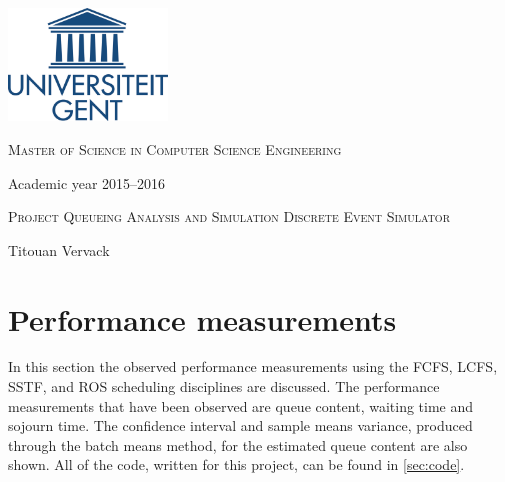 \documentclass[a4paper]{article}
\begin{document}
\begin{titlepage}
\fontsize{12pt}{14pt}\selectfont

\begin{center}

\includegraphics[height=3cm]{logo}

\vspace{1cm}

\fontsize{14pt}{17pt}\selectfont
\textsc{Master of Science in Computer Science Engineering}
\fontsize{12pt}{14pt}\selectfont
\vspace{0.3cm}

\vspace{1.2cm}

Academic year 2015--2016

\vspace{2.8cm}

\fontsize{17.28pt}{21pt}\selectfont

\textsc{Project Queueing Analysis and Simulation}
\fontsize{14.28pt}{21pt}\selectfont
\textsc{Discrete Event Simulator}

\fontsize{12pt}{14pt}\selectfont

\vspace{2.8cm}

Titouan Vervack

\end{center}
\end{titlepage}
\newpage
\fontsize{12pt}{16pt}\selectfont

\section{Performance measurements}
In this section the observed performance measurements using the FCFS, LCFS, SSTF, and ROS scheduling disciplines are discussed. The performance measurements that have been observed are queue content, waiting time and sojourn time. The confidence interval and sample means variance, produced through the batch means method, for the estimated queue content are also shown.
All of the code, written for this project, can be found in \ref{sec:code}.
\end{document}
